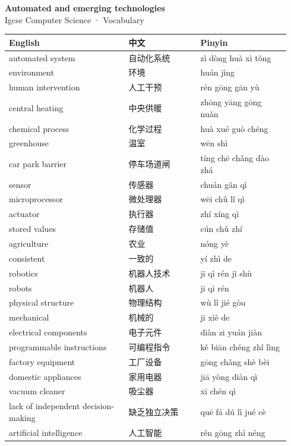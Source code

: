\documentclass[11pt]{article}
\begin{document}
\begin{center}
  {\LARGE\bfseries Automated and emerging technologies}\\[0.35em]
  {\large Igcse Computer Science · Vocabulary}
\end{center}
\vspace{0.6em}

\begin{longtable}{@{}p{0.40\linewidth}p{0.24\linewidth}p{0.30\linewidth}@{}}
\toprule
\textbf{English} & \textbf{中文} & \textbf{Pinyin} \\
\midrule
\endhead
\bottomrule
\endlastfoot
automated system & 自动化系统 & zì dòng huà xì tǒng \\
environment & 环境 & huán jìng \\
human intervention & 人工干预 & rén gōng gān yù \\
central heating & 中央供暖 & zhōng yāng gōng nuǎn \\
chemical process & 化学过程 & huà xué guò chéng \\
greenhouse & 温室 & wēn shì \\
car park barrier & 停车场道闸 & tíng chē chǎng dào zhá \\
sensor & 传感器 & chuán gǎn qì \\
microprocessor & 微处理器 & wēi chǔ lǐ qì \\
actuator & 执行器 & zhí xíng qì \\
stored values & 存储值 & cún chǔ zhí \\
agriculture & 农业 & nóng yè \\
consistent & 一致的 & yí zhì de \\
robotics & 机器人技术 & jī qì rén jì shù \\
robots & 机器人 & jī qì rén \\
physical structure & 物理结构 & wù lǐ jié gòu \\
mechanical & 机械的 & jī xiè de \\
electrical components & 电子元件 & diàn zi yuán jiàn \\
programmable instructions & 可编程指令 & kě biān chéng zhǐ lìng \\
factory equipment & 工厂设备 & gōng chǎng shè bèi \\
domestic appliances & 家用电器 & jiā yòng diàn qì \\
vacuum cleaner & 吸尘器 & xī chén qì \\
lack of independent decision-making & 缺乏独立决策 & quē fá dú lì jué cè \\
artificial intelligence & 人工智能 & rén gōng zhì néng \\

\end{longtable}
\end{document}
